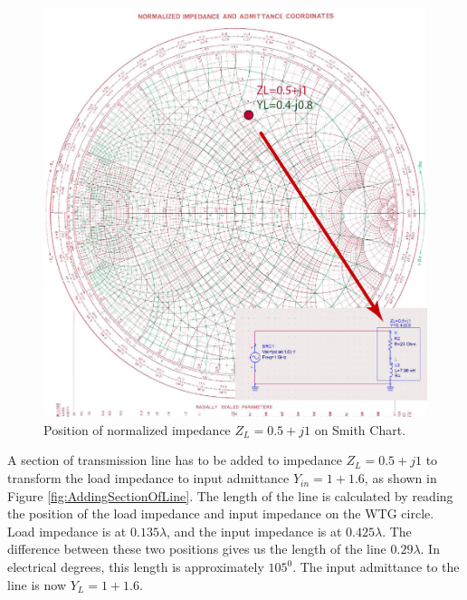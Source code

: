 \documentclass{ximera}
\begin{document}
\begin{figure}[htbp]
\begin{center}
\includegraphics[scale=0.4]{../jpg/Match1.jpg}
\end{center}
\caption{Position of normalized impedance $Z_L=0.5+j1$ on Smith Chart.}
\label{fig:NormImponSC}
\end{figure}

A section of transmission line has to be added to impedance $Z_L=0.5+j1$ to transform the load impedance to input admittance $Y_{in}=1+1.6$, as shown in Figure \ref{fig:AddingSectionOfLine}. The length of the line is calculated by reading the position of the load impedance and input impedance on the WTG circle. Load impedance is at $0.135 \lambda$, and the input impedance is at $0.425 \lambda$. The difference between these two positions gives us the length of the line $0.29 \lambda$. In electrical degrees, this length is approximately $105^0$. The input admittance to the line is now $Y_L=1+1.6$. 
\end{document}
